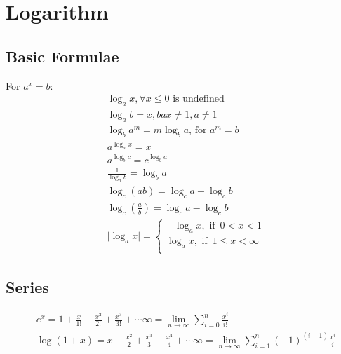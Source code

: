 \documentclass[../main.tex]{subfiles}
\begin{document}
	\chapter{Logarithm}	
	\section{Basic Formulae}
	For $a^x=b$:
	\begin{align}
		& \log_{a}{x}, \forall x \leq 0 \text{ is undefined}\\
		& \log_a b = x, bax \neq 1, a \neq 1\\
		& \log_b a^m = m \log_b a \text{, for } a^m=b\\
		& a^{\log_a x} = x\\
		& a^{\log_b c} = c^{\log_b a}\\
		& \frac{1}{\log_a b} = \log_b a\\
		& \log_c (ab) = \log_c a+\log_c b\\
		& \log_c \left( \frac{a}{b} \right) = \log_c a-\log_c b\\
		& \vert \log_a x \vert=\begin{cases}
			-\log_a x, \text{ if } \, 0 < x < 1\\
			\log_a x, \text{ if } \, 1\leq x < \infty \\
		\end{cases}
	\end{align}
	
	\section{Series}
	\begin{align}
		& e^x = 1 + \frac{x}{1!} + \frac{x^2}{2!} + \frac{x^3}{3!} + \cdots \infty = \lim_{n \to \infty} \sum_{i=0}^{n} \frac{x^i}{i!} \\
		& \log(1+x) = x - \frac{x^2}{2} + \frac{x^3}{3} - \frac{x^4}{4} + \cdots \infty = \lim_{n\to\infty} \sum_{i=1}^{n}(-1)^{(i-1)} \frac{x^i}{i}
	\end{align}
\end{document}
